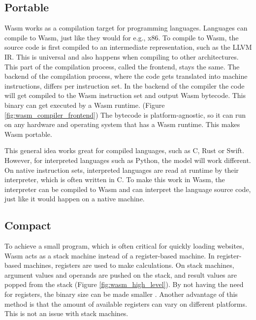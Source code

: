 \subsection{Portable}
\acrfull{Wasm} works as a compilation target for programming languages. Languages can compile to Wasm, just like they would for e.g., x86.
To compile to Wasm, the source code is first compiled to an intermediate representation, such as the LLVM IR. This is universal and also happens when compiling to other architectures. This part of the compilation process, called the frontend, stays the same. The backend of the compilation process, where the code gets translated into machine instructions, differs per instruction set. In the backend of the compiler the code will get compiled to the Wasm instruction set and output Wasm bytecode. This binary can get executed by a Wasm runtime. (Figure \ref{fig:wasm_compiler_frontend}) The bytecode is platform-agnostic, so it can run on any hardware and operating system that has a Wasm runtime. This makes Wasm portable.

This general idea works great for compiled languages, such as C, Rust or Swift. However, for interpreted languages such as Python, the model will work different. On native instruction sets, interpreted languages are read at runtime by their interpreter, which is often written in C. To make this work in Wasm, the interpreter can be compiled to Wasm and can interpret the language source code, just like it would happen on a native machine.

\subsection{Compact}
To achieve a small program, which is often critical for quickly loading websites, Wasm acts as a stack machine instead of a register-based machine. In register-based machines, registers are used to make calculations. On stack machines, argument values and operands are pushed on the stack, and result values are popped from the stack (Figure \ref{fig:wasm_high_level}). \cite{bringing_the_web_up_to_speed} By not having the need for registers, the binary size can be made smaller \cite{stack_vs_register_machine}. Another advantage of this method is that the amount of available registers can vary on different platforms. This is not an issue with stack machines.

